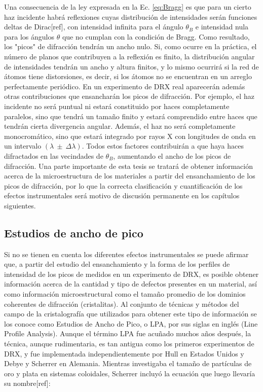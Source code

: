 Una consecuencia de la ley expresada en la Ec. \ref{eq:Bragg} es que para un cierto haz incidente habrá reflexiones cuyas distribución de intensidades serán funciones deltas de Dirac[ref], con intensidad infinita para el ángulo $\theta_{B}$ e intensidad nula para los ángulos $\theta$ que no cumplan con la condición de Bragg. Como resultado, los "picos" de difracción tendrán un ancho nulo. 
Si, como ocurre en la práctica, el número de planos que contribuyen a la reflexión es finito, la distribución angular de intensidades tendrán un ancho y altura finitos, y lo mismo ocurrirá si la red de átomos tiene distorsiones, es decir, si los átomos no se encuentran en un arreglo perfectamente periódico. 
En un experimento de DRX real aparecerán además otras contribuciones que ensancharán los picos de difracción. 
Por ejemplo, el haz incidente no será puntual ni estará constituido por haces completamente paralelos, sino que tendrá un tamaño finito y estará comprendido entre haces que tendrán cierta divergencia angular.
Además, el haz no será completamente monocromático, sino que estará integrado por rayos X con longitudes de onda en un intervalo $(\lambda \ \pm \ \Delta \lambda)$. 
Todos estos factores contribuirán a que haya haces difractados en las vecindades de $\theta_{B}$, aumentando el ancho de los picos de difracción. Una parte importante de esta tesis se tratará de obtener información acerca de la microestructura de los materiales a partir del ensanchamiento de los picos de difracción, por lo que la correcta clasificación y cuantificación de los efectos instrumentales será motivo de discusión permanente en los capítulos siguientes.

\subsection{Estudios de ancho de pico}\label{SS:DRX-LPA}
Si no se tienen en cuenta los diferentes efectos instrumentales se puede afirmar que, a partir del estudio del ensanchamiento y la forma de los perfiles de intensidad de los picos de medidos en un experimento de DRX, es posible obtener información acerca de la cantidad y tipo de defectos presentes en un material, así como información microestructural como el tamaño promedio de los dominios coherentes de difracción (cristalitas).
Al conjunto de técnicas y métodos del campo de la cristalografía que utilizados para obtener este tipo de información se los conoce como Estudios de Ancho de Pico, o LPA, por sus siglas en inglés (Line Profile Analysis).
Aunque el término LPA fue acuñado muchos años después, la técnica, aunque rudimentaria, es tan antigua como los primeros experimentos de DRX, y fue implementada independientemente por Hull en Estados Unidos y Debye y Scherrer en Alemania. Mientras investigaba el tamaño de partículas de oro y plata en sistemas coloidales, Scherrer incluyó la ecuación que luego llevaría su nombre[ref]:

